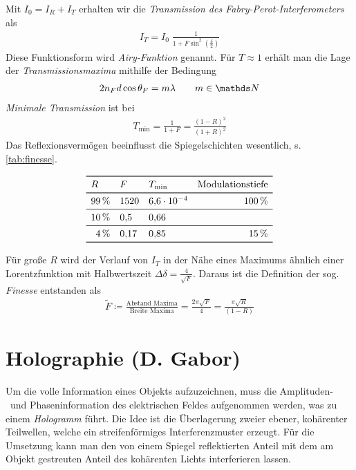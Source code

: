 Mit $I_0=I_R+I_T$ erhalten wir die \emph{Transmission des
  Fabry-Perot-Interferometers} als
\begin{gather*} 
  I_T = I_0\;\frac{1}{1+F\sin^2\left( \frac{\delta}{2} \right)}
\end{gather*}
Diese Funktionsform wird \emph{Airy-Funktion}
genannt.
Für $T\approx 1$ erhält man die Lage der \emph{Transmissionsmaxima} mithilfe
der Bedingung
\begin{gather*}
  2n_Fd\cos\theta_F = m\lambda \qquad m\in\N
\end{gather*}
\emph{Minimale Transmission} ist bei
\begin{gather*}
  T_\text{min} = \frac{1}{1+F} = \frac{(1-R)^2}{(1+R)^2}
\end{gather*}
Das Reflexionsvermögen beeinflusst die Spiegelschichten wesentlich,
s.\,\autoref{tab:finesse}.
\begin{table}
  \centering
  \begin{equation*}
    \begin{array}{ r l l r }
      \toprule
      \multicolumn{1}{l}{R} & F & T_\text{min} & \multicolumn{1}{l}{\text{Modulationstiefe}}\\
      \midrule[\heavyrulewidth]
      \SI{99}{\percent} & \num{1520} & \num{6.6e-4} & \SI{100}{\percent}\\
      \midrule
      \SI{10}{\percent} & \num{0.5} & \num{0.66} & \\
      \midrule
      \SI{4}{\percent} & \num{0.17} & \num{0.85} & \SI{15}{\percent}\\
      \bottomrule
    \end{array}
  \end{equation*}
\end{table}
Für große $R$ wird der Verlauf von $I_T$ in der Nähe eines Maximums
ähnlich einer Lorentzfunktion mit Halbwertszeit 
$\Delta\delta=\frac{4}{\sqrt{F}}$.
Daraus ist die Definition der sog. \emph{Finesse}
entstanden als
\begin{gather*}
  \widetilde F 
  \coloneqq \frac{\text{Abstand Maxima}}{\text{Breite Maxima}} 
  = \frac{2\pi\sqrt{F}}{4}
  = \frac{\pi\sqrt{R}}{(1-R)}
\end{gather*}%

\section[Holographie]{Holographie (D. Gabor)}
Um die volle Information eines Objekts aufzuzeichnen, muss die
Amplituden-~und Phaseninformation des elektrischen Feldes aufgenommen
werden, was zu einem \emph{Hologramm} führt.
Die Idee ist die Überlagerung zweier ebener, kohärenter Teilwellen,
welche ein streifenförmiges Interferenzmuster erzeugt.
Für die Umsetzung kann man den von einem Spiegel reflektierten Anteil
mit dem am Objekt gestreuten Anteil des kohärenten Lichts
interferieren lassen.

